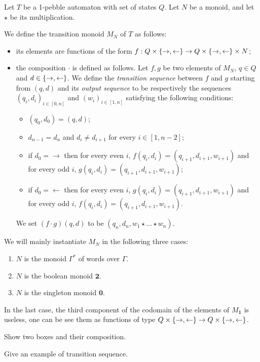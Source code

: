    
\begin{definition}%
Let $T$ be a 1-pebble automaton with set of states $Q$. Let $N$ be a monoid, and let $\star$ be its multiplication.

We define the transition monoid $M_N$ of $T$ as follows:
\begin{itemize}
\item its elements are functions of the form $f:Q\times\{\rightarrow,\leftarrow\}\to Q\times\{\rightarrow,\leftarrow\}\times N$;
\item the composition $\cdot$ is defined as follows. Let $f, g$ be two elements of $M_N$, $q\in Q$ and $d\in\{\rightarrow, \leftarrow\}$. We define the \emph{transition sequence} between 
$f$ and $g$ starting from $(q,d)$ and its \emph{output sequence} to be respectively the sequences $(q_i,d_i)_{i\in[0,n]}$ and  $(w_i)_{i\in[1,n]}$ satisfying the following conditions: 
\begin{itemize}
\item $(q_0,d_0)=(q,d)$;
\item $d_{n-1}=d_{n}$ and $d_i\neq d_{i+1}$ for every $i\in[1,n-2]$;
\item if $d_0=\rightarrow$ then for every even $i$, $f(q_i,d_i)=(q_{i+1},d_{i+1}, w_{i+1})$ and for every odd $i$, $g(q_i,d_i)=(q_{i+1},d_{i+1}, w_{i+1})$;
\item if $d_0=\leftarrow$ then for every even $i$, $g(q_i,d_i)=(q_{i+1},d_{i+1}, w_{i+1})$ and for every odd $i$, $f(q_i,d_i)=(q_{i+1},d_{i+1}, w_{i+1})$. 
\end{itemize}
We set $(f\cdot g) (q,d)$ to be $(q_n, d_n, w_1\star\dots\star w_n)$.
\end{itemize}
\end{definition}
We will mainly instantiate $M_N$ in the following three cases: 
\begin{enumerate}
\item $N$ is the monoid $\Gamma^*$ of words over $\Gamma$.
\item $N$ is the boolean monoid $\mathbf 2$.
\item $N$ is the singleton monoid $\mathbf 0$.
\end{enumerate}
In the last case, the third component of the codomain of the elements of $M_{\mathbf 1}$ is useless, one can be see them as functions of type $Q\times\{\rightarrow,\leftarrow\}\to Q\times\{\rightarrow,\leftarrow\}$.

\begin{example}
\begin{center}
Show two boxes and their composition.

Give an example of transition sequence.
\end{center}
\end{example}

